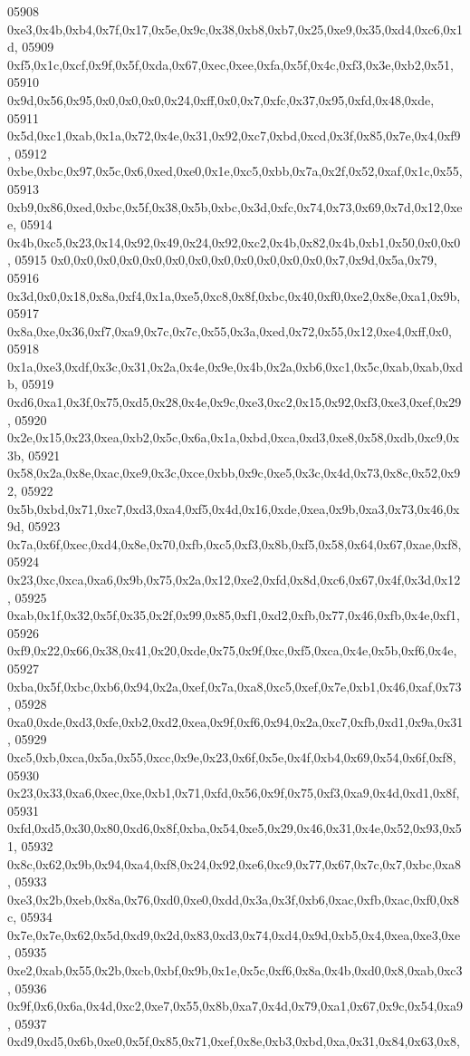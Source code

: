\begin{DoxyCode}
05908   0xe3,0x4b,0xb4,0x7f,0x17,0x5e,0x9c,0x38,0xb8,0xb7,0x25,0xe9,0x35,0xd4,0xc6,0x1d,
05909   0xf5,0x1c,0xcf,0x9f,0x5f,0xda,0x67,0xec,0xee,0xfa,0x5f,0x4c,0xf3,0x3e,0xb2,0x51,
05910   0x9d,0x56,0x95,0x0,0x0,0x0,0x24,0xff,0x0,0x7,0xfc,0x37,0x95,0xfd,0x48,0xde,
05911   0x5d,0xc1,0xab,0x1a,0x72,0x4e,0x31,0x92,0xc7,0xbd,0xcd,0x3f,0x85,0x7e,0x4,0xf9,
05912   0xbe,0xbc,0x97,0x5c,0x6,0xed,0xe0,0x1e,0xc5,0xbb,0x7a,0x2f,0x52,0xaf,0x1c,0x55,
05913   0xb9,0x86,0xed,0xbc,0x5f,0x38,0x5b,0xbc,0x3d,0xfc,0x74,0x73,0x69,0x7d,0x12,0xee,
05914   0x4b,0xc5,0x23,0x14,0x92,0x49,0x24,0x92,0xc2,0x4b,0x82,0x4b,0xb1,0x50,0x0,0x0,
05915   0x0,0x0,0x0,0x0,0x0,0x0,0x0,0x0,0x0,0x0,0x0,0x0,0x7,0x9d,0x5a,0x79,
05916   0x3d,0x0,0x18,0x8a,0xf4,0x1a,0xe5,0xc8,0x8f,0xbc,0x40,0xf0,0xe2,0x8e,0xa1,0x9b,
05917   0x8a,0xe,0x36,0xf7,0xa9,0x7c,0x7c,0x55,0x3a,0xed,0x72,0x55,0x12,0xe4,0xff,0x0,
05918   0x1a,0xe3,0xdf,0x3c,0x31,0x2a,0x4e,0x9e,0x4b,0x2a,0xb6,0xc1,0x5c,0xab,0xab,0xdb,
05919   0xd6,0xa1,0x3f,0x75,0xd5,0x28,0x4e,0x9c,0xe3,0xc2,0x15,0x92,0xf3,0xe3,0xef,0x29,
05920   0x2e,0x15,0x23,0xea,0xb2,0x5c,0x6a,0x1a,0xbd,0xca,0xd3,0xe8,0x58,0xdb,0xc9,0x3b,
05921   0x58,0x2a,0x8e,0xac,0xe9,0x3c,0xce,0xbb,0x9c,0xe5,0x3c,0x4d,0x73,0x8c,0x52,0x92,
05922   0x5b,0xbd,0x71,0xc7,0xd3,0xa4,0xf5,0x4d,0x16,0xde,0xea,0x9b,0xa3,0x73,0x46,0x9d,
05923   0x7a,0x6f,0xec,0xd4,0x8e,0x70,0xfb,0xc5,0xf3,0x8b,0xf5,0x58,0x64,0x67,0xae,0xf8,
05924   0x23,0xc,0xca,0xa6,0x9b,0x75,0x2a,0x12,0xe2,0xfd,0x8d,0xc6,0x67,0x4f,0x3d,0x12,
05925   0xab,0x1f,0x32,0x5f,0x35,0x2f,0x99,0x85,0xf1,0xd2,0xfb,0x77,0x46,0xfb,0x4e,0xf1,
05926   0xf9,0x22,0x66,0x38,0x41,0x20,0xde,0x75,0x9f,0xc,0xf5,0xca,0x4e,0x5b,0xf6,0x4e,
05927   0xba,0x5f,0xbc,0xb6,0x94,0x2a,0xef,0x7a,0xa8,0xc5,0xef,0x7e,0xb1,0x46,0xaf,0x73,
05928   0xa0,0xde,0xd3,0xfe,0xb2,0xd2,0xea,0x9f,0xf6,0x94,0x2a,0xc7,0xfb,0xd1,0x9a,0x31,
05929   0xc5,0xb,0xca,0x5a,0x55,0xcc,0x9e,0x23,0x6f,0x5e,0x4f,0xb4,0x69,0x54,0x6f,0xf8,
05930   0x23,0x33,0xa6,0xec,0xe,0xb1,0x71,0xfd,0x56,0x9f,0x75,0xf3,0xa9,0x4d,0xd1,0x8f,
05931   0xfd,0xd5,0x30,0x80,0xd6,0x8f,0xba,0x54,0xe5,0x29,0x46,0x31,0x4e,0x52,0x93,0x51,
05932   0x8c,0x62,0x9b,0x94,0xa4,0xf8,0x24,0x92,0xe6,0xc9,0x77,0x67,0x7c,0x7,0xbc,0xa8,
05933   0xe3,0x2b,0xeb,0x8a,0x76,0xd0,0xe0,0xdd,0x3a,0x3f,0xb6,0xac,0xfb,0xac,0xf0,0x8c,
05934   0x7e,0x7e,0x62,0x5d,0xd9,0x2d,0x83,0xd3,0x74,0xd4,0x9d,0xb5,0x4,0xea,0xe3,0xe,
05935   0xe2,0xab,0x55,0x2b,0xcb,0xbf,0x9b,0x1e,0x5c,0xf6,0x8a,0x4b,0xd0,0x8,0xab,0xc3,
05936   0x9f,0x6,0x6a,0x4d,0xc2,0xe7,0x55,0x8b,0xa7,0x4d,0x79,0xa1,0x67,0x9c,0x54,0xa9,
05937   0xd9,0xd5,0x6b,0xe0,0x5f,0x85,0x71,0xef,0x8e,0xb3,0xbd,0xa,0x31,0x84,0x63,0x8,

\end{DoxyCode}
